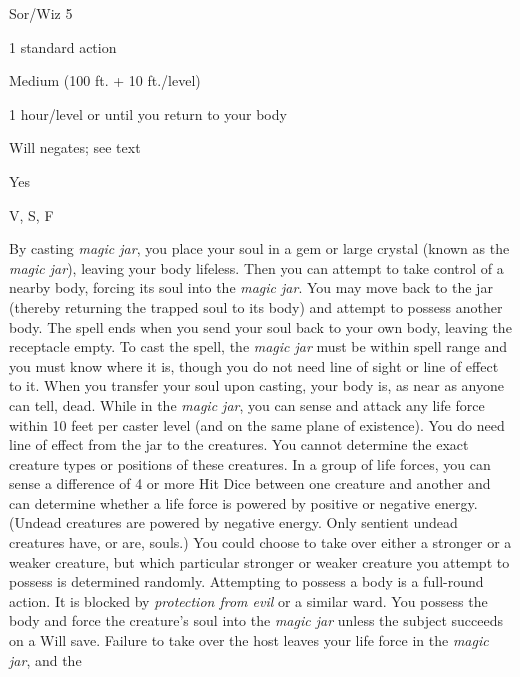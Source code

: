 
\begin{description*}
\item[Level:] Sor/Wiz 5
\item[Casting Time:] 1 standard action
\item[Range:] Medium (100 ft. + 10 ft./level)
\item[Duration:] 1 hour/level or until you return to your body
\item[Saving Throw:] Will negates; see text
\item[Spell Resistance:] Yes
\item[Components:] V, S, F
\end{description*}

By casting \textit{magic jar}, you place your soul in a gem or large crystal (known
as the \textit{magic jar}), leaving your body lifeless. Then you can attempt to
take control of a nearby body, forcing its soul into the \textit{magic jar}. You
may move back to the jar (thereby returning the trapped soul to its body) and attempt
to possess another body. The spell ends when you send your soul back to your own
body, leaving the receptacle empty.
To cast the spell, the \textit{magic jar} must be within spell range and you must
know where it is, though you do not need line of sight or line of effect to it.
When you transfer your soul upon casting, your body is, as near as anyone can tell,
dead.
While in the \textit{magic jar}, you can sense and attack any life force within
10 feet per caster level (and on the same plane of existence). You do need line
of effect from the jar to the creatures. You cannot determine the exact creature
types or positions of these creatures. In a group of life forces, you can sense
a difference of 4 or more Hit Dice between one creature and another and can determine
whether a life force is powered by positive or negative energy. (Undead creatures
are powered by negative energy. Only sentient undead creatures have, or are, souls.)
You could choose to take over either a stronger or a weaker creature, but which
particular stronger or weaker creature you attempt to possess is determined randomly.
Attempting to possess a body is a full-round action. It is blocked by \textit{protection
from evil} or a similar ward. You possess the body and force the creature's soul
into the \textit{magic jar} unless the subject succeeds on a Will save. Failure
to take over the host leaves your life force in the \textit{magic jar}, and the
